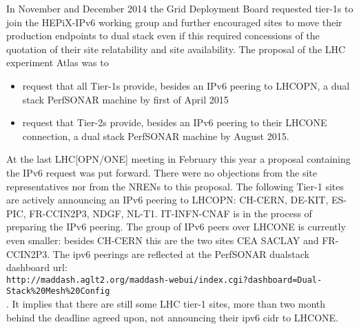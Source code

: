 In November and December 2014 the Grid Deployment Board requested tier-1s to join the HEPiX-IPv6 working group and further encouraged sites to move their production endpoints to dual stack even if this required concessions of the quotation of their site relatability and site availability. The proposal of the LHC experiment Atlas was to
\begin{itemize}
 \item request that all Tier-1s provide,
	besides an IPv6 peering to LHCOPN,
        a dual stack PerfSONAR machine by first of April 2015
 \item request that Tier-2s provide,
        besides an IPv6 peering to their LHCONE connection,
        a dual stack PerfSONAR machine by August 2015.
\end{itemize}
At the last LHC[OPN/ONE] meeting in February this year a proposal containing the IPv6 request was put forward. There were no objections from the site representatives nor from the NRENs to this proposal. The following Tier-1 sites are actively announcing an IPv6 peering to LHCOPN: CH-CERN, DE-KIT, ES-PIC, FR-CCIN2P3, NDGF, NL-T1. IT-INFN-CNAF is in the process of preparing the IPv6 peering. The group of IPv6 peers over LHCONE is currently even smaller: besides CH-CERN this are the two sites CEA SACLAY and FR-CCIN2P3.
The ipv6 peerings are reflected at the PerfSONAR dualstack dashboard url:\\{\tt\small http://maddash.aglt2.org/maddash-webui/index.cgi?dashboard=Dual-Stack\%20Mesh\%20Config}\\. It implies that there are still some LHC tier-1 sites, more than two month behind the deadline agreed upon, not announcing their ipv6 cidr to LHCONE.

